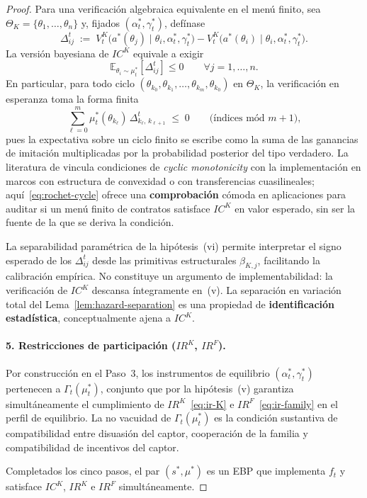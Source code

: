 \documentclass[12pt]{article}
\providecommand{\textcite}{\citet}
\theoremstyle{definition}
\theoremstyle{remark}
\newcommand{\1}{\mathbf{1}}
\begin{document}
\begin{proof}
Para una verificación algebraica equivalente en el menú finito, sea $\Theta_K=\{\theta_1,\ldots,\theta_n\}$ y, fijados $(\alpha_t^\ast,\gamma_t^\ast)$, defínase
\[
\Delta_{ij}^t
\;:=\;
V^K_t\!\bigl(a^\ast(\theta_j)\mid\theta_i,\alpha_t^\ast,\gamma_t^\ast\bigr)
-
V^K_t\!\bigl(a^\ast(\theta_i)\mid\theta_i,\alpha_t^\ast,\gamma_t^\ast\bigr).
\]
La versión bayesiana de $IC^K$ equivale a exigir
\[
\mathbb{E}_{\theta_i\sim\mu_t^\ast}\!\left[\Delta_{ij}^t\right]\le0
\qquad \forall j=1,\ldots,n.
\]
En particular, para todo ciclo $(\theta_{k_0},\theta_{k_1},\ldots,\theta_{k_m},\theta_{k_0})$ en $\Theta_K$, la verificación en esperanza toma la forma finita
\begin{equation}
\label{eq:rochet-cycle}
\sum_{\ell=0}^{m}
\mu_t^\ast(\theta_{k_\ell})\,
\Delta_{k_\ell,\,k_{\ell+1}}^t
\;\le\;0
\qquad\text{(índices mód }m+1\text{)},
\end{equation}
pues la expectativa sobre un ciclo finito se escribe como la suma de las ganancias de imitación multiplicadas por la probabilidad posterior del tipo verdadero. La literatura de \textcite{Rochet1987,RochetChone1998} vincula condiciones de \emph{cyclic monotonicity} con la implementación en marcos con estructura de convexidad o con transferencias cuasilineales; aquí~\eqref{eq:rochet-cycle} ofrece una \textbf{comprobación} cómoda en aplicaciones para auditar si un menú finito de contratos satisface $IC^K$ en valor esperado, sin ser la fuente de la que se deriva la condición.

La separabilidad paramétrica de la hipótesis~\textup{(vi)} permite interpretar el signo esperado de los $\Delta_{ij}^t$ desde las primitivas estructurales $\beta_{K,j}$, facilitando la calibración empírica. No constituye un argumento de implementabilidad: la verificación de $IC^K$ descansa íntegramente en~\textup{(v)}. La separación en variación total del Lema~\ref{lem:hazard-separation} es una propiedad de \textbf{identificación estadística}, conceptualmente ajena a $IC^K$.

\paragraph{5. Restricciones de participación \textup{(}$IR^K$, $IR^F$\textup{)}.}
Por construcción en el Paso~3, los instrumentos de equilibrio $(\alpha_t^\ast,\gamma_t^\ast)$ pertenecen a $\Gamma_t(\mu_t^\ast)$, conjunto que por la hipótesis~(v) garantiza simultáneamente el cumplimiento de $IR^K$~\eqref{eq:ir-K} e $IR^F$~\eqref{eq:ir-family} en el perfil de equilibrio. La no vacuidad de $\Gamma_t(\mu_t^\ast)$ es la condición sustantiva de compatibilidad entre disuasión del captor, cooperación de la familia y compatibilidad de incentivos del captor.

Completados los cinco pasos, el par $(s^\ast,\mu^\ast)$ es un EBP que implementa $f_t$ y satisface $IC^K$, $IR^K$ e $IR^F$ simultáneamente.
\end{proof}
\end{document}
